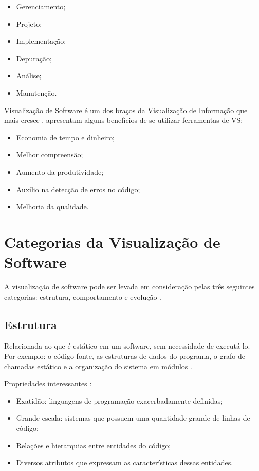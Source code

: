 \begin{itemize}
	\item Gerenciamento;
	\item Projeto;
	\item Implementação;
	\item Depuração;
	\item Análise;
	\item Manutenção.
\end{itemize}

Visualização de Software é um dos braços da Visualização de Informação que mais
cresce \cite{telea2014data}.  apresentam alguns
benefícios de se utilizar ferramentas de VS:

\begin{itemize}
	\item Economia de tempo e dinheiro;
	\item Melhor compreensão;
	\item Aumento da produtividade;
	\item Auxílio na detecção de erros no código;
	\item Melhoria da qualidade.
\end{itemize}

\section{Categorias da Visualização de Software}

A visualização de software pode ser levada em consideração pelas três seguintes
categorias: estrutura, comportamento e evolução \cite{diehl2007software}.

\subsection{Estrutura}

Relacionada ao que é estático em um software, sem necessidade de executá-lo. Por
exemplo: o código-fonte, as estruturas de dados do programa, o grafo de chamadas
estático e a organização do sistema em módulos \cite{diehl2007software}.

Propriedades interessantes \cite{messias2012}:

\begin{itemize}
	\item Exatidão: linguagens de programação exacerbadamente definidas;
	\item Grande escala: sistemas que possuem uma quantidade grande de linhas
	de código;
	\item Relações e hierarquias entre entidades do código;
	\item Diversos atributos que expressam as características dessas entidades.
\end{itemize}

